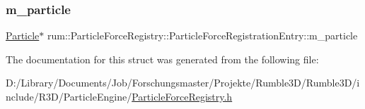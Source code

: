 \subsubsection{\texorpdfstring{m\+\_\+particle}{m\_particle}}
{\footnotesize\ttfamily \mbox{\hyperlink{classrum_1_1_particle}{Particle}}$\ast$ rum\+::\+Particle\+Force\+Registry\+::\+Particle\+Force\+Registration\+Entry\+::m\+\_\+particle}



The documentation for this struct was generated from the following file\+:\begin{DoxyCompactItemize}
\item 
D\+:/\+Library/\+Documents/\+Job/\+Forschungsmaster/\+Projekte/\+Rumble3\+D/\+Rumble3\+D/include/\+R3\+D/\+Particle\+Engine/\mbox{\hyperlink{_particle_force_registry_8h}{Particle\+Force\+Registry.\+h}}\end{DoxyCompactItemize}
